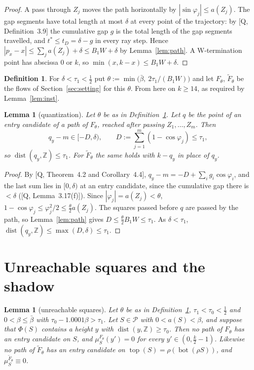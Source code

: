 \documentclass[11pt]{amsart}
\newcommand{\Z}{\mathbb Z}
\newcommand{\cP}{\mathcal P}
\newcommand{\Bot}{\operatorname{bot}}
\newcommand{\Top}{\operatorname{top}}
\newcommand{\dist}{\operatorname{dist}}
\newcommand{\bbar}{\bar\beta}
\newtheorem{lemma}[theorem]{Lemma}
\theoremstyle{definition}
\newtheorem{definition}[theorem]{Definition}
\theoremstyle{remark}
\numberwithin{equation}{section}
\begin{document}
\begin{proof}
A pass through $Z_j$ moves the path horizontally by $|\sin\varphi_j|\le a(Z_j)$. The gap segments have total length at
most $\delta$ at every point of the trajectory: by [Q, Definition~3.9] the cumulative gap $g$ is the total length of
the gap segments travelled, and $t^*\le t_D=\delta-g$ in every ray step. Hence
$|p_x-x|\le\sum_ja(Z_j)+\delta\le B_1W+\delta$ by Lemma~\ref{lem:path}. A W-termination point has abscissa $0$ or $k$,
so $\min(x,k-x)\le B_1W+\delta$.
\end{proof}

\begin{definition}\label{def:theta}
For $\delta<\tau_1<\frac12$ put $\theta:=\min\big(\bbar,\ 2\tau_1/(B_1W)\big)$ and let $F_\theta$, $\tilde F_\theta$ be the
flows of Section~\ref{sec:setting} for this $\theta$. From here on $k\ge14$, as required by Lemma~\ref{lem:inst}.
\end{definition}

\begin{lemma}[quantization]\label{lem:quant}
Let $\theta$ be as in Definition~\ref{def:theta}. Let $q$ be the point of an entry candidate of a path of $F_\theta$,
reached after passing $Z_1,\dots,Z_m$. Then
\[
q_y-m\in[-D,\delta),\qquad D:=\sum_{j=1}^m(1-\cos\varphi_j)\le\tau_1 ,
\]
so $\dist(q_y,\Z)\le\tau_1$. For $\tilde F_\theta$ the same holds with $k-q_y$ in place of $q_y$.
\end{lemma}

\begin{proof}
By [Q, Theorem~4.2 and Corollary~4.4], $q_y-m=-D+\sum_ig_i\cos\varphi_i$, and the last sum lies in $[0,\delta)$ at an
entry candidate, since the cumulative gap there is $<\delta$ ([Q, Lemma~3.17(f)]). Since $|\varphi_j|=a(Z_j)<\theta$, $1-\cos\varphi_j\le\varphi_j^2/2\le\frac\theta2a(Z_j)$. The squares
passed before $q$ are passed by the path, so Lemma~\ref{lem:path} gives $D\le\frac\theta2B_1W\le\tau_1$. As
$\delta<\tau_1$, $\dist(q_y,\Z)\le\max(D,\delta)\le\tau_1$.
\end{proof}

\section{Unreachable squares and the shadow}\label{sec:shadow}

\begin{lemma}[unreachable squares]\label{lem:unreach}
Let $\theta$ be as in Definition~\ref{def:theta}, $\tau_1<\tau_0<\frac12$ and $0<\beta\le\bbar$ with
$\tau_0-1.0001\beta>\tau_1$. Let $S\in\cP$ with $0<a(S)<\beta$, and suppose that $\Phi(S)$ contains a height $y$ with
$\dist(y,\Z)\ge\tau_0$. Then no path of $F_\theta$ has an entry candidate on $S$, and $\mu_S^{F_\theta}(y')=0$ for every
$y'\in(0,\frac k2-1)$. Likewise no path of $\tilde F_\theta$ has an entry candidate on $\Top(S)=\rho(\Bot(\rho S))$, and
$\mu_S^{\tilde F_\theta}\equiv0$.
\end{lemma}
\end{document}
